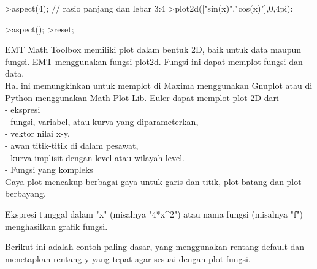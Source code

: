 \documentclass[12pt,arial,letterpaper]{book}
\begin{document}
\begin{eulernootebook}
\begin{eulercomment}
\begin{eulercomment}
\begin{eulernootebook}
\begin{eulercomment}
\begin{eulercomment}
\begin{eulercomment}
\begin{eulercomment}
\begin{eulercomment}
\begin{eulercomment}
\begin{eulercomment}
\begin{eulernotebook}
\begin{eulercomment}
\end{eulercomment}
\begin{eulerprompt}
>aspect(4); // rasio panjang dan lebar 3:4
>plot2d(["sin(x)","cos(x)"],0,4pi):
\end{eulerprompt}
\begin{eulerprompt}
>aspect();
>reset;
\end{eulerprompt}
\begin{eulercomment}
EMT Math Toolbox memiliki plot dalam bentuk 2D, baik untuk data maupun
fungsi. EMT menggunakan fungsi plot2d. Fungsi ini dapat memplot fungsi
dan data.\\
Hal ini memungkinkan untuk memplot di Maxima menggunakan Gnuplot atau
di Python menggunakan Math Plot Lib. Euler dapat memplot plot 2D dari\\
-   ekspresi\\
-   fungsi, variabel, atau kurva yang diparameterkan,\\
-   vektor nilai x-y,\\
-   awan titik-titik di dalam pesawat,\\
-   kurva implisit dengan level atau wilayah level.\\
-   Fungsi yang kompleks\\
Gaya plot mencakup berbagai gaya untuk garis dan titik, plot batang
dan plot berbayang.


\begin{eulercomment}
\begin{eulercomment}
Ekspresi tunggal dalam "x" (misalnya "4*x\textasciicircum{}2") atau nama fungsi
(misalnya "f") menghasilkan grafik fungsi.

Berikut ini adalah contoh paling dasar, yang menggunakan rentang
default dan menetapkan rentang y yang tepat agar sesuai dengan plot
fungsi.


\end{eulercomment}
\end{eulercomment}
\end{eulercomment}
\end{eulernotebook}
\end{eulercomment}
\end{eulercomment}
\end{eulercomment}
\end{eulercomment}
\end{eulercomment}
\end{eulercomment}
\end{eulercomment}
\end{eulernootebook}
\end{eulercomment}
\end{eulercomment}
\end{eulernootebook}
\end{document}
